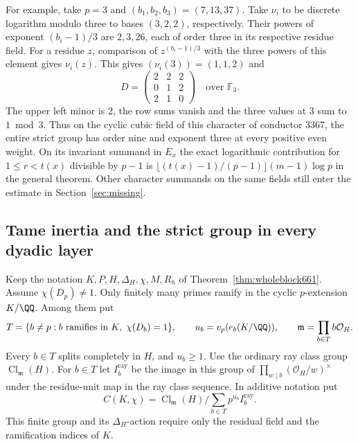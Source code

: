 \documentclass[a4paper,11pt]{article}
\theoremstyle{definition}
\theoremstyle{remark}
\numberwithin{equation}{section}
\newcommand{\Cl}{\operatorname{Cl}}
\begin{document}
For example, take \(p=3\) and \((b_1,b_2,b_3)=(7,13,37)\).
Take \(\nu_i\) to be discrete logarithm modulo three to bases
\((3,2,2)\), respectively. Their powers of exponent
\((b_i-1)/3\) are \(2,3,26\), each of order three in its
respective residue field. For a residue \(z\), comparison of
\(z^{(b_i-1)/3}\) with the three powers of this element gives
\(\nu_i(z)\). This gives \((\nu_i(3))=(1,1,2)\) and
\[
       D=\begin{pmatrix}2&2&2\\0&1&2\\2&1&0\end{pmatrix}
                          \quad\text{over }\mathbb F_3 .
\]
The upper left minor is \(2\), the row sums vanish and the
three values at \(3\) sum to \(1\bmod3\). Thus on the cyclic
cubic field of this character of conductor \(3367\), the entire
strict group has order nine and exponent three at every positive
even weight. On its invariant summand in \(E_x\) the exact
logarithmic contribution for \(1\le r<t(x)\) divisible by
\(p-1\) is \(\lfloor(t(x)-1)/(p-1)\rfloor(m-1)\log p\)
in the general theorem. Other character summands on the same
fields still enter the estimate in Section~\ref{sec:missing}.


\subsection{Tame inertia and the strict group in every dyadic layer}
\label{sec:tameray662}

Keep the notation \(K,P,H,\Delta_H,\chi,M,R_h\) of
Theorem~\ref{thm:wholeblock661}. Assume \(\chi(D_p)\ne1\).
Only finitely many primes ramify in the cyclic \(p\)-extension
\(K/\QQ\). Among them put
\[
 T=\{b\ne p:b\text{ ramifies in }K,\ \chi(D_b)=1\},\qquad
 u_b=v_p(e_b(K/\QQ)),\qquad \mathfrak m=\prod_{b\in T}b\mathcal O_H .
\]
Every \(b\in T\) splits completely in \(H\), and \(u_b\ge1\).
Use the ordinary ray class group \(\Cl_{\mathfrak m}(H)\).
For \(b\in T\) let \(I_b^{\mathrm{ray}}\) be the image in this
group of \(\prod_{w\mid b}(\mathcal O_H/w)^\times\) under the
residue-unit map in the ray class sequence. In additive notation put
\[
 C(K,\chi)=\Cl_{\mathfrak m}(H)\Big/
                      \sum_{b\in T}p^{u_b}I_b^{\mathrm{ray}} .
\]
This finite group and its \(\Delta_H\)-action require only the
residual field and the ramification indices of \(K\).
\end{document}
